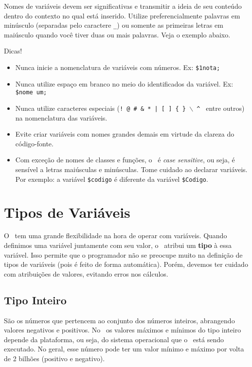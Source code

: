 Nomes de variáveis devem ser significativas e transmitir a ideia de seu conteúdo 
dentro do contexto no qual está inserido.
Utilize preferencialmente palavras em minúsculo (separadas pelo caractere \texttt{\_}) ou 
somente as primeiras letras em maiúsculo quando você tiver duas ou mais palavras. 
Veja o exemplo abaixo. 



Dicas! \newline
\begin{itemize}
    \item Nunca inicie a nomenclatura de variáveis com números. Ex: \texttt{\$1nota;}
    \item Nunca utilize espaço em branco no meio do identificados da variável. Ex: \texttt{\$nome um;}
    \item Nunca utilize caracteres especiais (\texttt{! @ \# \& * | [ ] \{ \} $\backslash$ \^ } 
    entre outros) na nomenclatura das variáveis.
    \item Evite criar variáveis com nomes grandes demais em virtude da clareza do código-fonte.
    \item Com exceção de nomes de classes e funções, o \php~é \textit{case sensitive}, ou seja, 
    é sensível a letras maiúsculas e minúsculas. Tome cuidado ao declarar variáveis. Por exemplo: 
    a variável \texttt{\$codigo} é diferente da variável \texttt{\$Codigo}.
\end{itemize}


\section{Tipos de Variáveis}
\label{tipos-de-variaveis}

O \php~tem uma grande flexibilidade na hora de operar com variáveis. Quando definimos
uma variável juntamente com seu valor, o \php~atribui um \textbf{tipo} à essa variável.
Isso permite que o programador não se preocupe muito na definição de tipos de 
variáveis (pois é feito de forma automática). Porém, devemos ter cuidado com atribuições
de valores, evitando erros nos cálculos.

\subsection{Tipo Inteiro}
\label{tipo-inteiro}
São os números que pertencem ao conjunto dos números inteiros, abrangendo valores negativos
e positivos. No \php~os valores máximos e mínimos do tipo inteiro depende da plataforma,
ou seja, do sistema operacional que o \php~está sendo executado. No geral, esse número
pode ter um valor mínimo e máximo por volta de 2 bilhões (positivo e negativo).

